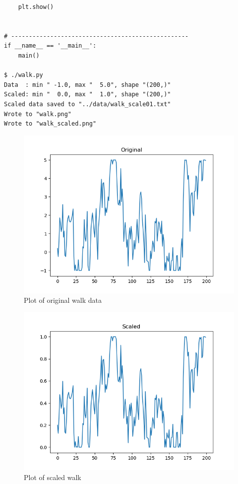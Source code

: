 \documentclass[10pt]{article}
\begin{document}
\begin{enumerate}
\begin{verbatim}
    plt.show()


# --------------------------------------------------
if __name__ == '__main__':
    main()

$ ./walk.py
Data  : min " -1.0, max "  5.0", shape "(200,)"
Scaled: min "  0.0, max "  1.0", shape "(200,)"
Scaled data saved to "../data/walk_scale01.txt"
Wrote to "walk.png"
Wrote to "walk_scaled.png"

\end{verbatim}

\begin{figure}

\centering
  \includegraphics[width=\linewidth]{code/walk.png}
 \caption{Plot of original walk data}
\label{label}

\end{figure}

\begin{figure}

\centering
  \includegraphics[width=\linewidth]{code/walk_scaled.png}
 \caption{Plot of scaled walk}
\label{label}


\end{figure}
\end{enumerate}
\end{document}
